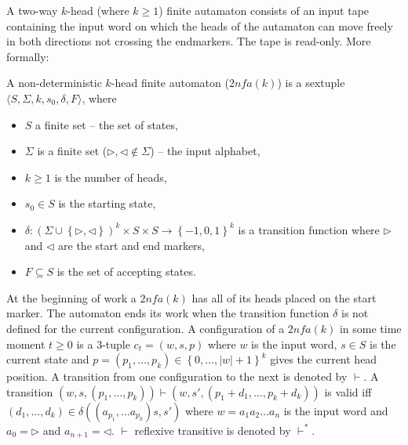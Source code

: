 \documentclass{llncs}
\begin{document}
A two-way $k$-head (where $k\geq 1$) finite autamaton consists of an input tape containing the input word on which the heads of the autamaton can move freely in both directions not crossing the endmarkers. The tape is read-only. More formally:
\begin{definition}
A non-deterministic $k$-head finite automaton ($2nfa(k)$) is a sextuple $\langle S, \Sigma, k, s_0, \delta, F \rangle$, where
\begin{itemize}
	\item $S$ a finite set -- the set of states,
	\item $\Sigma$ is a finite set ($ \triangleright,\triangleleft \notin \Sigma$) -- the input alphabet,
	\item $k\geq 1$ is the number of heads, 
	\item $s_0\in S$ is the starting state,
	\item $\delta: \left( \Sigma \cup \left\{ \triangleright, \triangleleft \right\} \right)^k \times S \times S \rightarrow \left\{-1,0,1\right\}^k$ is a transition function where $\triangleright$ and $\triangleleft$ are the start and end markers,
	\item $F \subseteq S$ is the set of accepting states.
\end{itemize}
\end{definition}
At the beginning of work a $2nfa(k)$ has all of its heads placed on the start marker. The automaton ends its work when the transition function $\delta$ is not defined for the current configuration. A configuration of a $2nfa(k)$ in some time moment $t\geq 0$ is a 3-tuple $c_t=\left(w,s,p\right)$ where $w$ is the input word, $s\in S$ is the current state and
$p = \left( p_1, \ldots, p_k \right) \in \left\{ 0, \ldots, |w| +1 \right\}^k $
gives the current head position. A transition from one configuration to the next is denoted by $\vdash$. A transition
$\left( w, s, \left( p_1, \ldots, p_k \right) \right) \vdash \left( w, s', \left( p_1+d_1, \ldots, p_k+d_k \right) \right)$
is valid iff
$\left(d_1, \ldots, d_k \right) \in \delta \left( \left( a_{p_1}, \ldots a_{p_k} \right) s, s' \right)$
where $w = a_1a_2 \ldots a_n$ is the input word and $a_0=\triangleright$ and $a_{n+1}=\triangleleft$. $\vdash$ reflexive transitive %
is denoted by $\vdash^*$.
\end{document}
